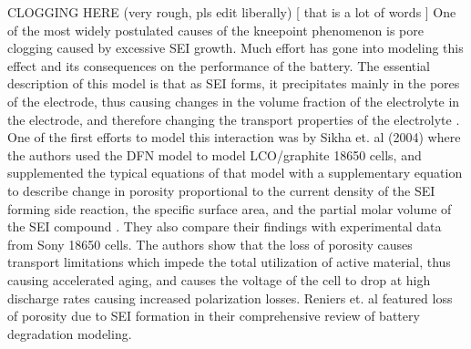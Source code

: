 \documentclass{article}
\begin{document}
CLOGGING HERE (very rough, pls edit liberally) [ that is a lot of words ]
One of the most widely postulated causes of the kneepoint phenomenon is pore clogging caused by excessive SEI growth. Much effort has gone into modeling this effect and its consequences on the performance of the battery. The essential description of this model is that as SEI forms, it precipitates mainly in the pores of the electrode, thus causing changes in the volume fraction of the electrolyte in the electrode, and therefore changing the transport properties of the electrolyte \cite{sikha_effect_2004}. One of the first efforts to model this interaction was by Sikha et. al (2004) where the authors used the DFN model to model LCO/graphite 18650 cells, and supplemented the typical equations of that model with a supplementary equation to describe change in porosity proportional to the current density of the SEI forming side reaction, the specific surface area, and the partial molar volume of the SEI compound \cite{sikha_effect_2004}. They also compare their findings with experimental data from Sony 18650 cells. The authors show that the loss of porosity causes transport limitations which impede the total utilization of active material, thus causing accelerated aging, and causes the voltage of the cell to drop at high discharge rates causing increased polarization losses. Reniers et. al featured loss of porosity due to SEI formation in their comprehensive review of battery degradation modeling\cite{reniers_review_2019}. 
\end{document}
